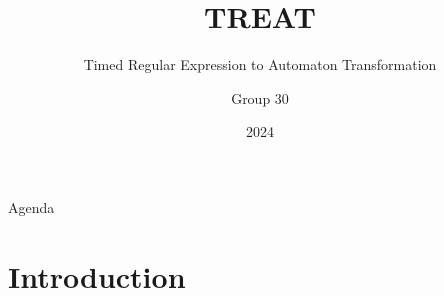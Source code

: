 \documentclass{beamer}
\title{TREAT}
\subtitle{Timed Regular Expression to Automaton Transformation}
\author{Group 30}
\institute{Aalborg Universitet}
\date{2024}
\begin{document}
\frame{\titlepage}

\begin{frame}{Agenda}
    \tableofcontents
\end{frame}

\section{Introduction} %






\end{document}
